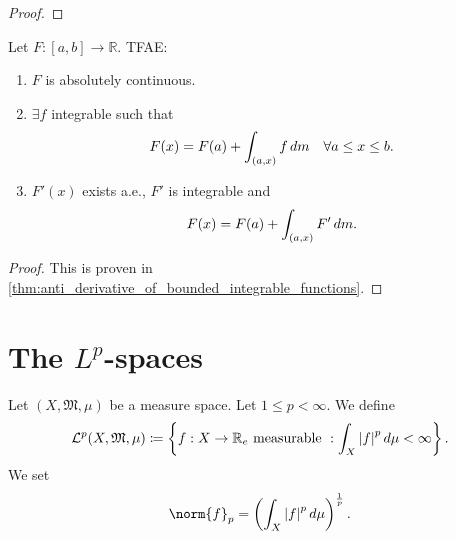 \documentclass[notoc,notitlepage]{tufte-book}
\begin{document}
\begin{proof}
\end{proof}

\begin{thm}\label{thm:fundamental_theorem_of_calculus_lebesgue_version}
  Let $F : [a, b] \to \mathbb{R}$. TFAE:
  \begin{enumerate}
    \item $F$ is absolutely continuous.
    \item $\exists f$ integrable such that
      \begin{equation*}
        F(x) = F(a) + \int_{(a, x)} f \mathop{}\!d{m} \quad \forall a \leq x \leq b.
      \end{equation*}
    \item $F'(x)$ exists a.e., $F'$ is integrable and
      \begin{equation*}
        F(x) = F(a) + \int_{(a, x)} F' \mathop{}\!d{m}.
      \end{equation*}
  \end{enumerate}
\end{thm}

\begin{proof}

   This is proven in
  \cref{thm:anti_derivative_of_bounded_integrable_functions}.
\end{proof}


\section{The \texorpdfstring{$L^p$}{LP}-spaces}%
\label{sec:the_l_p_spaces}

\begin{defn}\label{defn:_mathcal_l_p_spaces}
  Let $(X, \mathfrak{M}, \mu)$ be a measure space. Let $1 \leq p < \infty$.
  We define
  \begin{equation*}
    \mathcal{L}^p (X, \mathfrak{M}, \mu) \coloneqq \left\{ 
      f : X \to \mathbb{R}_e \text{ measurable } : \int_{X} \left|f\right|^p \mathop{}\!d{\mu} < \infty
    \right\}.
  \end{equation*}
  We set
  \begin{equation*}
    \norm{f}_p = \left( \int_{X} \abs{f}^p \dif{\mu} \right)^{\frac{1}{p}}.
  \end{equation*}
\end{defn}
\end{document}
